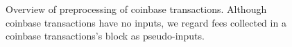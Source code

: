 % 
%

\begin{figure}[t]
	
	\centering
	\caption{Overview of preprocessing of coinbase transactions. Although coinbase transactions have no inputs, we regard fees collected in a coinbase transactions's block as pseudo-inputs.}
\end{figure}



